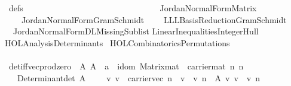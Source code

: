 %
\begin{isabellebody}%
%
%
\isadelimtheory
%
\endisadelimtheory
%
\isatagtheory
{}\isamarkupfalse%
\ defs\ \ \ \ \ \ \ \ \ \ \ \ \ \ \ \ \ \ \ \ \ \ \ \ \ \isanewline
\ \ \ \ \ \ \ Jordan{\isacharunderscore}{\kern0pt}Normal{\isacharunderscore}{\kern0pt}Form{\isachardot}{\kern0pt}Matrix\isanewline
\ \ \ \ Jordan{\isacharunderscore}{\kern0pt}Normal{\isacharunderscore}{\kern0pt}Form{\isachardot}{\kern0pt}Gram{\isacharunderscore}{\kern0pt}Schmidt\isanewline
\ \ \ \ LLL{\isacharunderscore}{\kern0pt}Basis{\isacharunderscore}{\kern0pt}Reduction{\isachardot}{\kern0pt}Gram{\isacharunderscore}{\kern0pt}Schmidt{\isacharunderscore}{\kern0pt}{}\isanewline
\ \ Jordan{\isacharunderscore}{\kern0pt}Normal{\isacharunderscore}{\kern0pt}Form{\isachardot}{\kern0pt}DL{\isacharunderscore}{\kern0pt}Missing{\isacharunderscore}{\kern0pt}Sublist\isanewline
Linear{\isacharunderscore}{\kern0pt}Inequalities{\isachardot}{\kern0pt}Integer{\isacharunderscore}{\kern0pt}Hull\isanewline
{\isachardoublequoteopen}HOL{\isacharminus}{\kern0pt}Analysis{\isachardot}{\kern0pt}Determinants{\isachardoublequoteclose}\isanewline
\ {\isachardoublequoteopen}HOL{\isacharminus}{\kern0pt}Combinatorics{\isachardot}{\kern0pt}Permutations{\isachardoublequoteclose}\isanewline
\ \ \ \ \ \ \ \ \ \ \ \ \ \ \ \ \ \ \ \ \ \ \ \ \ \ \ \ \ \ \ \ \ \ \ \ \isanewline
{}%
\endisatagtheory
{\isafoldtheory}%
%
\isadelimtheory
\isanewline
%
\endisadelimtheory
\isanewline
{}\isamarkupfalse%
\ det{\isacharunderscore}{\kern0pt}{}{\isacharunderscore}{\kern0pt}iff{\isacharunderscore}{\kern0pt}vec{\isacharunderscore}{\kern0pt}prod{\isacharunderscore}{\kern0pt}zero{}{\isacharcolon}{\kern0pt}\ \ A{\isacharcolon}{\kern0pt}\ {\isachardoublequoteopen}{\isacharparenleft}{\kern0pt}A\ {\isacharcolon}{\kern0pt}{\isacharcolon}{\kern0pt}\ {\isacharprime}{\kern0pt}a\ {\isacharcolon}{\kern0pt}{\isacharcolon}{\kern0pt}\ idom\ Matrix{\isachardot}{\kern0pt}mat{\isacharparenright}{\kern0pt}\ {\isasymin}\ carrier{\isacharunderscore}{\kern0pt}mat\ n\ n{\isachardoublequoteclose}\isanewline
\ \ \ {\isachardoublequoteopen}Determinant{\isachardot}{\kern0pt}det\ A\ {\isacharequal}{\kern0pt}\ {}\ {\isasymlongleftrightarrow}\ {\isacharparenleft}{\kern0pt}{\isasymexists}\ v{\isachardot}{\kern0pt}\ v\ {\isasymin}\ carrier{\isacharunderscore}{\kern0pt}vec\ n\ {\isasymand}\ v\ {\isasymnoteq}\ {}\isactrlsub v\ n\ {\isasymand}\ A\ {\isacharasterisk}{\kern0pt}\isactrlsub v\ v\ {\isacharequal}{\kern0pt}\ {}\isactrlsub v\ n{\isacharparenright}{\kern0pt}{\isachardoublequoteclose}\isanewline

\end{isabellebody}
